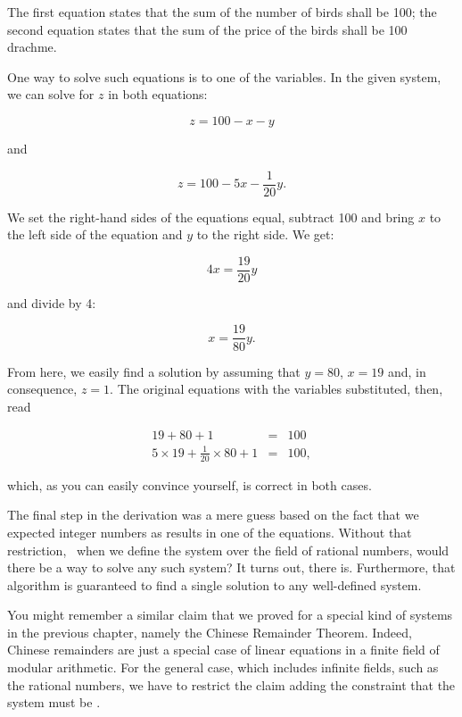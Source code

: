 \documentclass[tikz]{scrreprt}
\begin{document}
The first equation states that the sum of the number of birds
shall be 100; the second equation states that the sum of the
price of the birds shall be 100 drachme.

One way to solve such equations is 
to  one of the variables.
In the given system, we can solve for $z$
in both equations:

\begin{equation}
z = 100 - x - y
\end{equation}

and

\begin{equation}
z = 100 - 5x - \frac{1}{20}y.
\end{equation}

We set the right-hand sides of the equations equal, 
subtract 100
and bring $x$ to the left side of the equation
and $y$ to the right side. We get:

\begin{equation}
4x = \frac{19}{20}y
\end{equation}

and divide by 4:

\begin{equation}
x = \frac{19}{80}y.
\end{equation}

From here, we easily find a solution
by assuming that $y=80$, $x=19$ and, in consequence,
$z=1$. The original equations with the variables 
substituted, then, read 

\begin{equation}
\begin{array}{lcl}
19 + 80 + 1 & = & 100\\
5\times 19 + \frac{1}{20}\times 80 + 1 & = & 100,
\end{array}
\end{equation}

which, as you can easily convince yourself, is correct
in both cases.

The final step in the derivation was a mere guess
based on the fact that we expected integer numbers
as results in one of the equations. 
Without that restriction, \ie\ when
we define the system over the field of rational
numbers, would there be a way to solve any such
system? It turns out, there is. Furthermore,
that algorithm is guaranteed to find a single solution to
any well-defined system.

You might remember a similar claim that we proved
for a special kind of systems in the previous chapter,
namely the Chinese Remainder Theorem. Indeed,
Chinese remainders are just a special case of
linear equations in a finite field of modular arithmetic.
For the general case, which includes infinite fields,
such as the rational numbers, we have to restrict
the claim adding the constraint that the system
must be .
\end{document}
